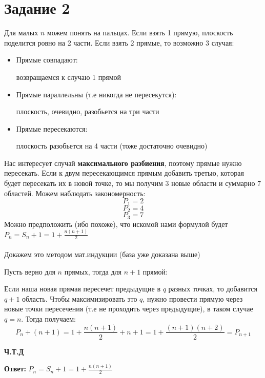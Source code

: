 \documentclass[a4paper,12pt]{article}
\author{Бурмашев Григорий, БПМИ-208}
\title{}
\date{\today}
\begin{document}
\section*{Задание 2}
Для малых $n$ можем понять на пальцах. Если взять 1 прямую, плоскость поделится ровно на 2 части. Если взять 2 прямые, то возможно 3 случая:
\begin{itemize}
\item Прямые совпадают:

возвращаемся к случаю 1 прямой

\item Прямые параллельны (т.е никогда не пересекутся):

плоскость, очевидно, разобьется на три части

\item Прямые пересекаются:

плоскость разобьется на 4 части (тоже достаточно очевидно)
\end{itemize}

Нас интересует случай \textbf{максимального разбиения}, поэтому прямые нужно пересекать. Если к двум пересекающимся прямым добавить третью, которая будет пересекать их в новой точке, то мы получим 3 новые области и суммарно 7 областей.
Можем наблюдать закономерность:
\[
P_1 = 2
\]
\[
P_2 = 4
\]
\[
P_3 = 7
\]
Можно предположить (ибо похоже), что искомой нами формулой будет $P_n = S_n  + 1 =  1 + \frac{n(n+1)}{2}$
\\\\
Докажем это методом мат.индукции (база уже доказана выше)

Пусть верно для $n$ прямых, тогда для $n + 1$ прямой:

Если наша новая прямая пересечет предыдущие в $q$ разных точках, то добавится $q + 1$ область. Чтобы максимизировать это $q$, нужно провести прямую через новые точки пересечения (т.е не проходить через предыдущие), в таком случае $q = n$. Тогда получаем:
\[
 P_{n} + (n + 1) = 1 + \frac{n(n+1)}{2} + n + 1 = 1 + \frac{(n+1)(n+2)}{2} = P_{n + 1}
\]
\begin{center}
\textbf{Ч.Т.Д } 
\end{center}
\begin{center}
\textbf{Ответ: } $P_n = S_n  + 1 =  1 + \frac{n(n+1)}{2}$
\end{center}
\end{document}
